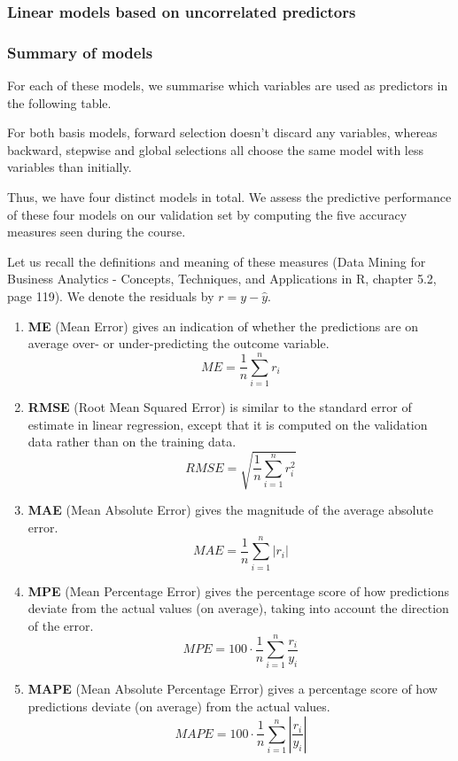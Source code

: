 \documentclass[
  paper=a4,
  ,captions=tableheading
]{scrartcl}
\providecommand{\tightlist}{%
  \setlength{\itemsep}{0pt}\setlength{\parskip}{0pt}}
\begin{document}
\hypertarget{linear-models-based-on-uncorrelated-predictors}{%
\subsubsection{Linear models based on uncorrelated
predictors}\label{linear-models-based-on-uncorrelated-predictors}}

\hypertarget{summary-of-models}{%
\subsubsection{Summary of models}\label{summary-of-models}}

For each of these models, we summarise which variables are used as
predictors in the following table.

For both basis models, forward selection doesn't discard any variables,
whereas backward, stepwise and global selections all choose the same
model with less variables than initially.

Thus, we have four distinct models in total. We assess the predictive
performance of these four models on our validation set by computing the
five accuracy measures seen during the course.

Let us recall the definitions and meaning of these measures (Data Mining
for Business Analytics - Concepts, Techniques, and Applications in R,
chapter 5.2, page 119). We denote the residuals by \(r = y - \hat y\).

\begin{enumerate}
\def\labelenumi{\arabic{enumi}.}
\tightlist
\item
  \textbf{ME} (Mean Error) gives an indication of whether the
  predictions are on average over- or under-predicting the outcome
  variable. \[ME = \dfrac{1}{n} \sum_{i=1}^{n}r_i\]
\item
  \textbf{RMSE} (Root Mean Squared Error) is similar to the standard
  error of estimate in linear regression, except that it is computed on
  the validation data rather than on the training data.
  \[RMSE =  \sqrt{\dfrac{1}{n}\sum_{i=1}^{n}r_i^2}\]
\item
  \textbf{MAE} (Mean Absolute Error) gives the magnitude of the average
  absolute error. \[MAE = \dfrac{1}{n} \sum_{i=1}^{n}|r_i|\]
\item
  \textbf{MPE} (Mean Percentage Error) gives the percentage score of how
  predictions deviate from the actual values (on average), taking into
  account the direction of the error.
  \[MPE = 100 \cdot \dfrac{1}{n} \sum_{i=1}^{n} \dfrac{r_i}{y_i}\]
\item
  \textbf{MAPE} (Mean Absolute Percentage Error) gives a percentage
  score of how predictions deviate (on average) from the actual values.
  \[MAPE = 100 \cdot \dfrac{1}{n} \sum_{i=1}^{n} \left| \dfrac{r_i}{y_i}\right|\]
\end{enumerate}
\end{document}
